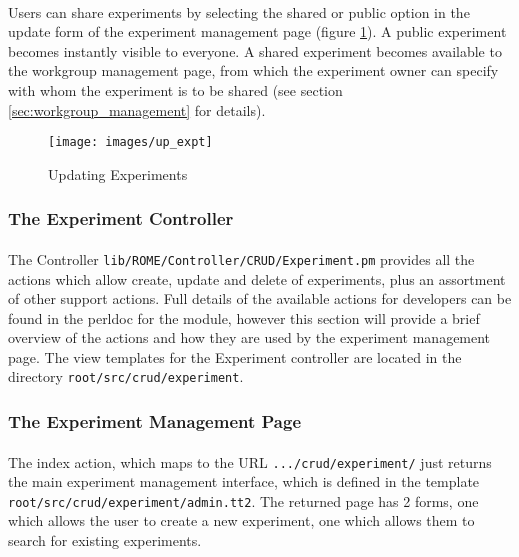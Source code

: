 \paragraph{}
Users can share experiments by selecting the shared or public option in the update form of the experiment management page (figure \ref{fig:up_expt}). A public experiment becomes instantly visible to everyone. A shared experiment becomes available to the workgroup management page, from which the experiment owner can specify with whom the experiment is to be shared (see section \ref{sec:workgroup_management} for details).


\begin{figure}
\centering
\caption{Updating Experiments}\label{fig:up_expt}
\texttt{[image: images/up\_expt]}
\end{figure}





\subsubsection{The Experiment Controller}

\paragraph{}
The Controller \texttt{lib/ROME/Controller/CRUD/Experiment.pm} provides all the actions which allow create, update and delete of experiments, plus an assortment of other support actions. Full details of the available actions for developers can be found in the perldoc for the module, however this section will provide a brief overview of the actions and how they are used by the experiment management page. The view templates for the Experiment controller are located in the directory \texttt{root/src/crud/experiment}.


\subsubsection{The Experiment Management Page}
\paragraph{}
The index action, which maps to the URL \texttt{.../crud/experiment/} just returns the main experiment management interface, which is defined in the template \texttt{root/src/crud/experiment/admin.tt2}. The returned page has 2 forms, one which allows the user to create a new experiment, one which allows them to search for existing experiments.

